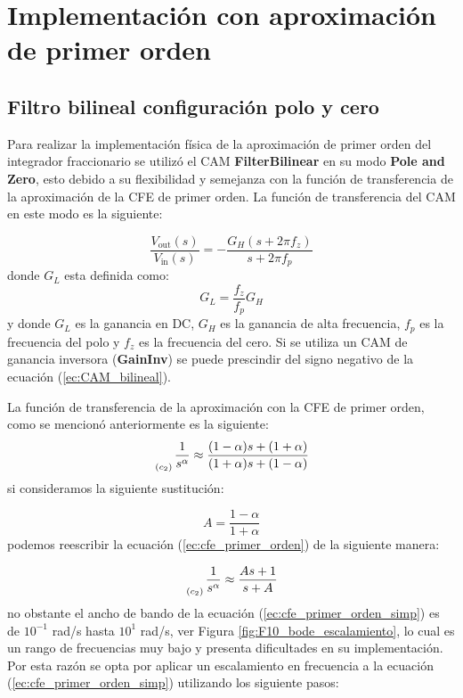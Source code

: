 \section{Implementación con aproximación de primer orden}
	
	\subsection{Filtro bilineal configuración polo y cero}
	
	Para realizar la implementación física de la aproximación de primer orden del integrador fraccionario se utilizó el CAM \textbf{FilterBilinear} en su modo \textbf{Pole and Zero}, esto debido a su flexibilidad y semejanza con la función de transferencia de la aproximación de la CFE de primer orden. La función de transferencia del CAM en este modo es la siguiente:
	
	\begin{equation}
		\frac{V_{\mathrm{out}} (s)}{V_{\mathrm{in}}(s)} = -\frac{G_{H} (s + 2 \pi f_{z})}{s + 2 \pi f_{p}}
		\label{ec:CAM_bilineal}
	\end{equation}
	donde $G_{L}$ esta definida como:
	\begin{equation}
		G_{L} = \frac{f_{z}}{f_{p}} G_{H}
	\end{equation}
	y donde $G_{L}$ es la ganancia en DC, $G_{H}$ es la ganancia de alta frecuencia, $f_{p}$ es la frecuencia del polo y $f_{z}$ es la frecuencia del cero. Si se utiliza un CAM de ganancia inversora (\textbf{GainInv}) se puede prescindir del signo negativo de la ecuación (\ref{ec:CAM_bilineal}).
	
	La función de transferencia de la aproximación con la CFE de primer orden, como se mencionó anteriormente es la siguiente:
	\begin{equation}
		\genfrac{}{}{0pt}{0}{}{_{(c_{2})}} \frac{1}{s^{\alpha}} \approx \frac{(1 - \alpha)s + (1 + \alpha) }{(1 + \alpha)s + (1 - \alpha)} 
		\label{ec:cfe_primer_orden}
	\end{equation}
	si consideramos la siguiente sustitución:
	
	\begin{equation}
		A = \frac{1 - \alpha}{1 + \alpha}
	\end{equation}
	podemos reescribir la ecuación (\ref{ec:cfe_primer_orden}) de la siguiente manera:
	
	\begin{equation}
		\genfrac{}{}{0pt}{0}{}{_{(c_{2})}} \frac{1}{s^{\alpha}} \approx \frac{A s + 1}{s + A}
		\label{ec:cfe_primer_orden_simp}
	\end{equation}
	no obstante el ancho de bando de la ecuación (\ref{ec:cfe_primer_orden_simp}) es de $10^{-1}$ rad/s hasta $10^{1}$ rad/s, ver Figura \ref{fig:F10_bode_escalamiento}, lo cual es un rango de frecuencias muy bajo y presenta dificultades en su implementación. Por  esta razón se opta por aplicar un escalamiento en frecuencia a la ecuación (\ref{ec:cfe_primer_orden_simp}) utilizando los siguiente pasos: 
	
